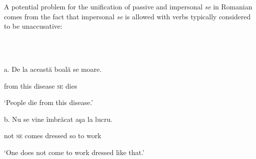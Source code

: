 \documentclass[output=paper]{langsci/langscibook}
\begin{document}
\begin{styleDSb}
 
\end{styleDSb}

\begin{styleDSb}
\textstylest{ }
\end{styleDSb}

\begin{styleDSb}
\end{styleDSb}

\begin{styleDSb}
\textstylest{}  
\end{styleDSb}

\begin{styleDSb}
\textstylest{    (}\textstylest{)}
\end{styleDSb}

A potential problem for the unification of passive and impersonal \textit{se} in Romanian comes from the fact that impersonal \textit{se} is allowed with verbs typically considered to be unaccusative:

\ea%
    \label{ex:key:11}
    \gll\\
        \\
    \glt
    \z

          a.   De la această boală    se  moare.    

      from  this       disease \textsc{se} dies

      ‘People die from this disease.’

b.   Nu se vine     îmbrăcat aşa la lucru.

      not \textsc{se} comes dressed  so   to work

     ‘One does not come to work dressed like that.’
\end{document}
